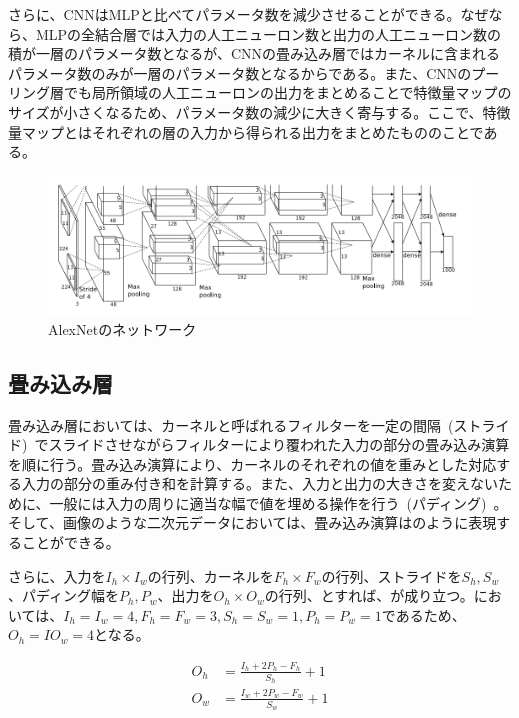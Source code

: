 さらに、CNNはMLPと比べてパラメータ数を減少させることができる。なぜなら、MLPの全結合層では入力の人工ニューロン数と出力の人工ニューロン数の積が一層のパラメータ数となるが、CNNの畳み込み層ではカーネルに含まれるパラメータ数のみが一層のパラメータ数となるからである。また、CNNのプーリング層でも局所領域の人工ニューロンの出力をまとめることで特徴量マップのサイズが小さくなるため、パラメータ数の減少に大きく寄与する。ここで、特徴量マップとはそれぞれの層の入力から得られる出力をまとめたもののことである。

\begin{figure}[b]
\centering
\includegraphics[width=\columnwidth]{figure/alex.png}
\caption{AlexNetのネットワーク}
\label{fig:Alex}
\end{figure}

\clearpage

\subsection{畳み込み層}

畳み込み層においては、カーネルと呼ばれるフィルターを一定の間隔~(ストライド)~でスライドさせながらフィルターにより覆われた入力の部分の畳み込み演算を順に行う。畳み込み演算により、カーネルのそれぞれの値を重みとした対応する入力の部分の重み付き和を計算する。また、入力と出力の大きさを変えないために、一般には入力の周りに適当な幅で値を埋める操作を行う~(パディング)~。そして、画像のような二次元データにおいては、畳み込み演算はのように表現することができる。

さらに、入力を$I_h \times I_w$の行列、カーネルを$F_h \times F_w$の行列、ストライドを$S_h,S_w$、パディング幅を$P_h,P_w$、出力を$O_h \times O_w$の行列、とすれば、が成り立つ。においては、$I_h=I_w=4,F_h=F_w=3,S_h=S_w=1,P_h=P_w=1$であるため、$O_h=IO_w=4$となる。

\begin{align}
    \label{eq:conv}
    O_{h}&=\frac{I_h+2 P_h-F_{h}}{S_h}+1 \\
    O_{w}&=\frac{I_w+2 P_w-F_{w}}{S_w}+1
\end{align}

